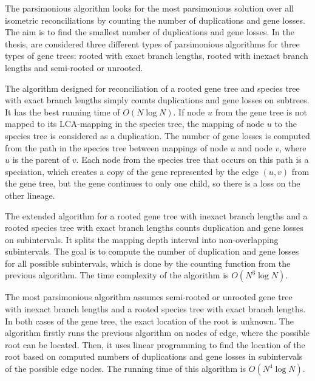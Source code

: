 The parsimonious algorithm looks for the most parsimonious solution over all isometric reconciliations by counting the number of duplications and gene losses. The aim is to find the smallest number of duplications and gene losses. In the thesis, \cite{chladek_thesis} are considered three different types of parsimonious algorithms for three types of gene trees: rooted with exact branch lengths, rooted with inexact branch lengths and semi-rooted or unrooted.

The algorithm designed for reconciliation of a rooted gene tree and species tree with exact branch lengths simply counts duplications and gene losses on subtrees. It has the best running time of $O(N \log N)$. If node $u$ from the gene tree is not mapped to its LCA-mapping in the species tree, the mapping of node $u$ to the species tree is considered as a duplication. The number of gene losses is computed from the path in the species tree between mappings of node $u$ and node $v$, where $u$ is the parent of $v$. Each node from the species tree that occurs on this path is a speciation, which creates a copy of the gene represented by the edge $(u, v)$ from the gene tree, but the gene continues to only one child, so there is a loss on the other lineage.

The extended algorithm for a rooted gene tree with inexact branch lengths and a rooted species tree with exact branch lengths counts duplication and gene losses on subintervals. It splits the mapping depth interval into non-overlapping subintervals. The goal is to compute the number of duplication and gene losses for all possible subintervals, which is done by the counting function from the previous algorithm. The time complexity of the algorithm is $O(N^3 \log N)$.

The most parsimonious algorithm assumes semi-rooted or unrooted gene tree with inexact branch lengths and a rooted species tree with exact branch lengths. In both cases of the gene tree, the exact location of the root is unknown. The algorithm firstly runs the previous algorithm on nodes of edge, where the possible root can be located. Then, it uses linear programming to find the location of the root based on computed numbers of duplications and gene losses in subintervals of the possible edge nodes. The running time of this algorithm is $O(N^4 \log N)$.
